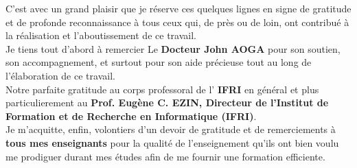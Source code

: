 \remerciements

C’est avec un grand plaisir que je réserve ces quelques lignes en signe de gratitude et de
profonde reconnaissance à tous ceux qui, de près ou de loin, ont contribué à la réalisation et
l’aboutissement de ce travail.\\Je tiens tout d’abord à remercier Le \textbf{Docteur John AOGA} pour son soutien, son accompagnement, et surtout pour son aide précieuse tout au long de l’élaboration de ce travail.\\Notre parfaite gratitude au corps professoral de l’\textbf{ IFRI }en général et plus particulierement au \textbf{Prof. Eugène C. EZIN, Directeur de l’Institut de Formation et de Recherche en Informatique (IFRI)}.\\Je m’acquitte, enfin, volontiers d’un devoir de gratitude et de remerciements à \textbf{tous mes
enseignants} pour la qualité de l’enseignement qu’ils ont bien voulu me prodiguer durant mes études afin de me fournir une formation efficiente. 